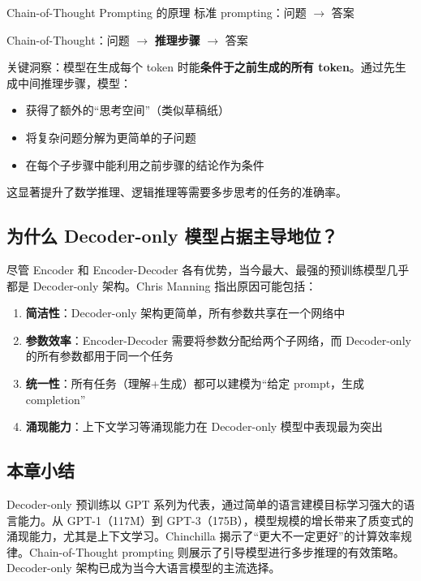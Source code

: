 \documentclass[a4paper]{article}
\begin{document}
\begin{importantbox}{Chain-of-Thought Prompting 的原理}
标准 prompting：问题 $\rightarrow$ 答案

Chain-of-Thought：问题 $\rightarrow$ \textbf{推理步骤} $\rightarrow$ 答案

关键洞察：模型在生成每个 token 时能\textbf{条件于之前生成的所有 token}。通过先生成中间推理步骤，模型：
\begin{itemize}
    \item 获得了额外的``思考空间''（类似草稿纸）
    \item 将复杂问题分解为更简单的子问题
    \item 在每个子步骤中能利用之前步骤的结论作为条件
\end{itemize}
这显著提升了数学推理、逻辑推理等需要多步思考的任务的准确率。
\end{importantbox}

\subsection{为什么 Decoder-only 模型占据主导地位？}

尽管 Encoder 和 Encoder-Decoder 各有优势，当今最大、最强的预训练模型几乎都是 Decoder-only 架构。Chris Manning 指出原因可能包括：

\begin{enumerate}
    \item \textbf{简洁性}：Decoder-only 架构更简单，所有参数共享在一个网络中
    \item \textbf{参数效率}：Encoder-Decoder 需要将参数分配给两个子网络，而 Decoder-only 的所有参数都用于同一个任务
    \item \textbf{统一性}：所有任务（理解+生成）都可以建模为``给定 prompt，生成 completion''
    \item \textbf{涌现能力}：上下文学习等涌现能力在 Decoder-only 模型中表现最为突出
\end{enumerate}

\subsection{本章小结}

Decoder-only 预训练以 GPT 系列为代表，通过简单的语言建模目标学习强大的语言能力。从 GPT-1（117M）到 GPT-3（175B），模型规模的增长带来了质变式的涌现能力，尤其是上下文学习。Chinchilla 揭示了``更大不一定更好''的计算效率规律。Chain-of-Thought prompting 则展示了引导模型进行多步推理的有效策略。Decoder-only 架构已成为当今大语言模型的主流选择。
\end{document}
